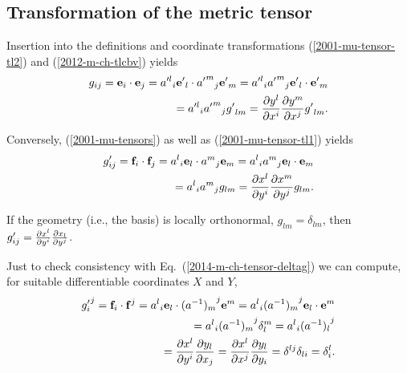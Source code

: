 \subsection{Transformation of the metric tensor}

Insertion into the definitions and coordinate transformations
 (\ref{2001-mu-tensor-tl2}) and (\ref{2012-m-ch-tlcbv})
yields
\begin{equation}
\begin{split}
g_{ij}={\bf e}_i\cdot {\bf e}_j
={a'^l}_i{\bf e'}_l\cdot {{a'}^m}_j{\bf e'}_m
={a'^l}_i{{a'}^m}_j {\bf e'}_l\cdot {\bf e'}_m \\
= {a'^l}_i{{a'}^m}_j  {g'}_{lm}
= {\partial { y }^l\over \partial x^i}{\partial { y }^m\over \partial x^j} {g'}_{lm}
.
\label{2011-m-emtdc}
\end{split}
\end{equation}

Conversely,  (\ref{2001-mu-tensors}) as well as    (\ref{2001-mu-tensor-tl1})
yields
\begin{equation}
\begin{split}
g'_{ij}={\bf f}_i\cdot {\bf f}_j
={a^l}_i{\bf e}_l\cdot {a^m}_j{\bf e}_m
={a^l}_i {a^m}_j {\bf e}_l\cdot {\bf e}_m  \\
= {a^l}_i {a^m}_j  {g}_{lm}
= {\partial {x}^l\over \partial { y }^i}{\partial {x}^m\over \partial { y }^j} {g}_{lm}
.
\end{split}
\label{2018-mm-ch-tensor-gpijgeneral}
\end{equation}


If the geometry (i.e., the basis) is locally orthonormal, ${g}_{lm}=\delta_{lm}$,
then
$g'_{ij}={\partial {x}^l\over \partial { y }^i}{\partial {x}_l\over \partial { y }^j}$.

Just to check consistency with Eq.~(\ref{2014-m-ch-tensor-deltag}) we can compute,
for suitable differentiable coordinates $X$ and $ Y $,
\begin{equation}
\begin{split}
{g'_i}^j={\bf f}_i\cdot {{\bf f}}^j
={a^l}_i{\bf e}_l\cdot {(a^{-1})_m}^j{\bf e}^m
={a^l}_i {(a^{-1})_m}^j {\bf e}_l\cdot {\bf e}^m  \\
= {a^l}_i {(a^{-1})_m}^j \delta_l^m
= {a^l}_i {(a^{-1})_l}^j  \\
= {\partial {x}^l\over \partial { y }^i}{\partial { y }_l\over \partial {x}_j}
= {\partial {x}^l\over \partial {x}^j}{\partial { y }_l\over \partial { y }_i}
= \delta^{lj}\delta_{li}
= \delta^l_i
.
\end{split}
\end{equation}

